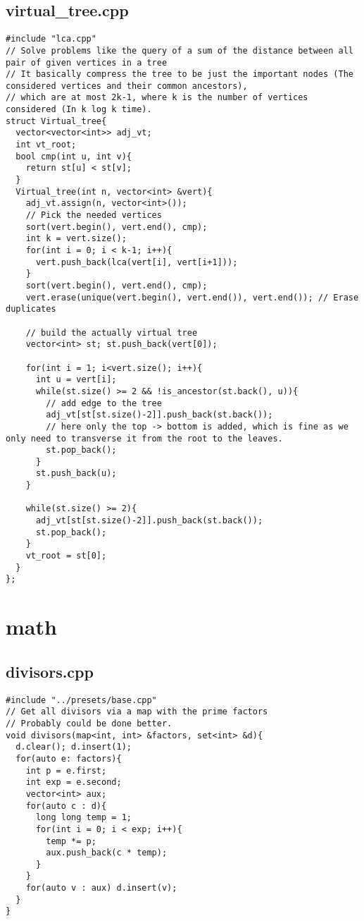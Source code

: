 \documentclass[11pt,landscape,twocolumn]{article}
\begin{document}
\subsection*{virtual\_tree.cpp}
\begin{lstlisting}
#include "lca.cpp"
// Solve problems like the query of a sum of the distance between all pair of given vertices in a tree
// It basically compress the tree to be just the important nodes (The considered vertices and their common ancestors),
// which are at most 2k-1, where k is the number of vertices considered (In k log k time). 
struct Virtual_tree{
  vector<vector<int>> adj_vt;
  int vt_root;
  bool cmp(int u, int v){
    return st[u] < st[v];
  }
  Virtual_tree(int n, vector<int> &vert){
    adj_vt.assign(n, vector<int>());
    // Pick the needed vertices 
    sort(vert.begin(), vert.end(), cmp);
    int k = vert.size();
    for(int i = 0; i < k-1; i++){
      vert.push_back(lca(vert[i], vert[i+1]));
    }
    sort(vert.begin(), vert.end(), cmp);
    vert.erase(unique(vert.begin(), vert.end()), vert.end()); // Erase duplicates

    // build the actually virtual tree
    vector<int> st; st.push_back(vert[0]);

    for(int i = 1; i<vert.size(); i++){
      int u = vert[i];
      while(st.size() >= 2 && !is_ancestor(st.back(), u)){
        // add edge to the tree
        adj_vt[st[st.size()-2]].push_back(st.back()); 
        // here only the top -> bottom is added, which is fine as we only need to transverse it from the root to the leaves.
        st.pop_back();
      }
      st.push_back(u);
    }

    while(st.size() >= 2){
      adj_vt[st[st.size()-2]].push_back(st.back());
      st.pop_back();
    }
    vt_root = st[0];
  }
};

\end{lstlisting}

\section{math}
\subsection*{divisors.cpp}
\begin{lstlisting}
#include "../presets/base.cpp"
// Get all divisors via a map with the prime factors
// Probably could be done better.
void divisors(map<int, int> &factors, set<int> &d){
  d.clear(); d.insert(1);
  for(auto e: factors){
    int p = e.first;
    int exp = e.second;
    vector<int> aux;
    for(auto c : d){
      long long temp = 1;
      for(int i = 0; i < exp; i++){
        temp *= p;
        aux.push_back(c * temp);
      }
    }
    for(auto v : aux) d.insert(v);
  }
}
\end{lstlisting}
\end{document}
